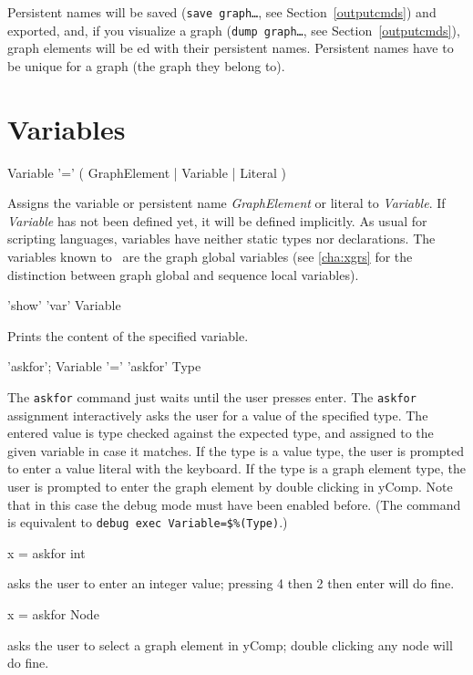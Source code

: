 \begin{note}
Persistent names will be saved (\texttt{save graph\dots}, see Section~\ref{outputcmds}) and exported,
and, if you visualize a graph (\texttt{dump graph\dots}, see Section~\ref{outputcmds}),
graph elements will be ed with their persistent names.
Persistent names have to be unique for a graph (the graph they belong to).
\end{note}


\section{Variables}

\begin{rail}
  Variable '=' ( GraphElement | Variable | Literal )
\end{rail}
Assigns the variable or persistent name \emph{GraphElement} or literal to \emph{Variable}.
If \emph{Variable} has not been defined yet, it will be defined implicitly.
As usual for scripting languages, variables have neither static types nor declarations.
The variables known to \GrShell\ are the graph global variables (see \ref{cha:xgrs} for the distinction between graph global and sequence local variables).

\begin{rail}
'show' 'var' Variable
\end{rail}
Prints the content of the specified variable.

\begin{rail}
  'askfor';
  Variable '=' 'askfor' Type
\end{rail}
The \texttt{askfor} command just waits until the user presses enter.
The \texttt{askfor} assignment interactively asks the user for a value of the specified type.
The entered value is type checked against the expected type, and assigned to the given variable in case it matches.
If the type is a value type, the user is prompted to enter a value literal with the keyboard.
If the type is a graph element type, the user is prompted to enter the graph element by double clicking in yComp.
Note that in this case the debug mode must have been enabled before.
(The command is equivalent to \verb#debug exec Variable=$%(Type)#.)

\begin{example}
\begin{grshelllet}
x = askfor int
\end{grshelllet}
asks the user to enter an integer value; pressing 4 then 2 then enter will do fine.
\begin{grshelllet}
x = askfor Node
\end{grshelllet}
asks the user to select a graph element in yComp; double clicking any node will do fine.
\end{example}


